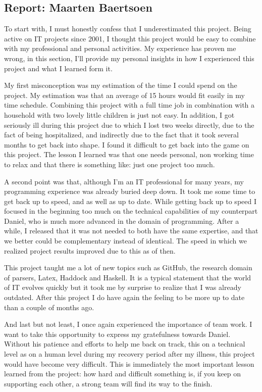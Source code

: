 
\subsection{Report: Maarten Baertsoen}
\label{subsec:assessment-maarten}
To start with, I must honestly confess that I underestimated this project.
Being active on IT projects since 2001, I thought this project would be easy to combine with my professional and personal activities.
My experience has proven me wrong, in this section, I'll provide my personal insights in how I experienced this project and what I learned form it.

My first misconception was my estimation of the time I could spend on the project.
My estimation was that an average of 15 hours would fit easily in my time schedule.
Combining this project with a full time job in combination with a household with two lovely little children is just not easy.
In addition, I got seriously ill during this project due to which I lost two weeks directly, due to the fact of being hospitalized, and indirectly due to the fact that it took several months to get back into shape.
I found it difficult to get back into the game on this project.
The lesson I learned was that one needs personal, non working time to relax and that there is something like: just one project too much.

A second point was that, although I'm an IT professional for many years, my programming experience was already buried deep down.
It took me some time to get back up to speed, and as well as up to date.
While getting back up to speed I focused in the beginning too much on the technical capabilities of my counterpart Daniel, who is much more advanced in the domain of programming. 
After a while, I released that it was not needed to both have the same expertise, and that we better could be complementary instead of identical.
The speed in which we realized project results improved due to this as of then.

This project taught me a lot of new topics such as GitHub, the research domain of parsers, Latex, Haddock and Haskell.
It is a typical statement that the world of IT evolves quickly but it took me by surprise to realize that I was already outdated.
After this project I do have again the feeling to be more up to date than a couple of months ago.

And last but not least, I once again experienced the importance of team work.
I want to take this opportunity to express my gratefulness towards Daniel.
Without his patience and efforts to help me back on track, this on a technical level as on a human level during my recovery period after my illness, this project would have become very difficult. 
This is immediately the most important lesson learned from the project: how hard and difficult something is, if you keep on supporting each other, a strong team will find its way to the finish.




